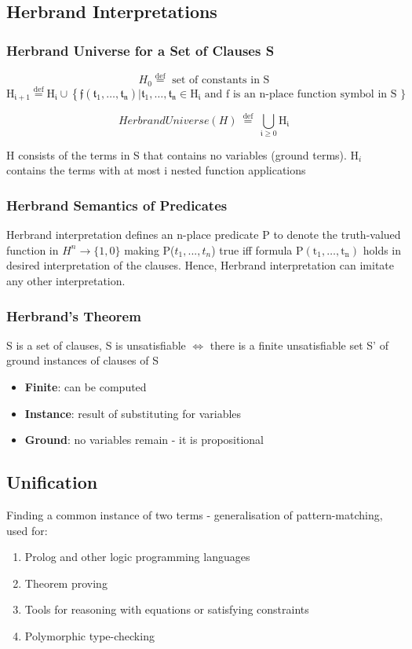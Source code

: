 \documentclass{article}
\begin{document}
\subsection{Herbrand Interpretations}
\subsubsection{Herbrand Universe for a Set of Clauses S}
$$H_{0} \stackrel{\mathrm{def}}{=} \text{ set of constants in S} $$ 
$$\mathrm{H}_{\mathfrak{i}+1} \stackrel{\mathrm{def}}{=} \mathrm{H}_{\mathfrak{i}} \cup\left\{\mathfrak{f}\left(\mathfrak{t}_{1}, \ldots, \mathfrak{t}_{\mathfrak{n}}\right) | \mathfrak{t}_{1}, \ldots, \mathfrak{t}_{\mathfrak{n}} \in \mathrm{H}_{\mathfrak{i}}\right. \text{ and f is an n-place function symbol in S \}} $$

$$Herbrand Universe (H) \stackrel{\text { def }}{=} \bigcup_{\mathfrak{i} \geq 0} \mathrm{H}_{\mathfrak{i}} $$

H consists of the terms in S that contains no variables (ground terms). H$_{i}$ contains the terms with at most i nested function applications

\subsubsection{Herbrand Semantics of Predicates}
Herbrand interpretation defines an n-place predicate P to denote the truth-valued function in $H^{n} \rightarrow \{ 1, 0 \}$ making P($t_{1}, ..., t_{n}$) true iff formula $\mathrm{P}\left(\mathrm{t}_{1}, \ldots, \mathrm{t}_{\mathrm{n}}\right)$ holds in desired interpretation of the clauses. Hence, Herbrand interpretation can imitate any other interpretation.

\subsubsection{Herbrand's Theorem}
S is a set of clauses, S is unsatisfiable $\iff$ there is a finite unsatisfiable set S' of ground instances of clauses of S
\begin{itemize}
    \item \textbf{Finite}: can be computed
    \item \textbf{Instance}: result of substituting for variables
    \item \textbf{Ground}: no variables remain - it is propositional
\end{itemize}

\subsection{Unification}
Finding a common instance of two terms - generalisation of pattern-matching, used for:
\begin{enumerate}
    \item Prolog and other logic programming languages
    \item Theorem proving
    \item Tools for reasoning with equations or satisfying constraints
    \item Polymorphic type-checking
\end{enumerate}
\end{document}
